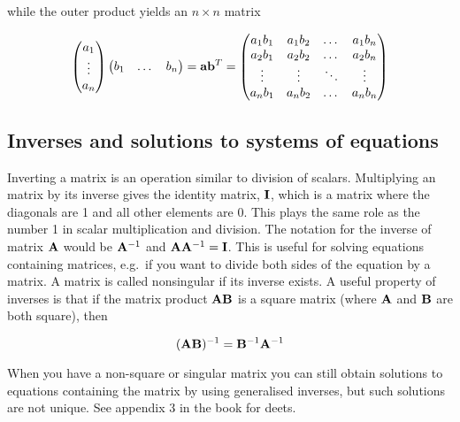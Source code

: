 \documentclass[
]{book}
\begin{document}
while the outer product yields an \(n \times n\) matrix

\begin{equation}
    \begin{pmatrix}
        a_1 \\
        \vdots \\
        a_n
    \end{pmatrix}
    \begin{pmatrix}
        b_1 & \dots & b_n
    \end{pmatrix}

    = \mx{a}\mx{b}^T = 

    \begin{pmatrix}
        a_1b_1 & a_1b_2 & \dots & a_1b_n \\
        a_2b_1 & a_2b_2 & \dots & a_2b_n \\
        \vdots & \vdots & \ddots & \vdots \\
        a_nb_1 & a_nb_2 & \dots & a_nb_n
    \end{pmatrix}
    \label{eq:outer-product}
\end{equation}

\hypertarget{inverses-and-solutions-to-systems-of-equations}{%
\subsection{Inverses and solutions to systems of equations}\label{inverses-and-solutions-to-systems-of-equations}}

Inverting a matrix is an operation similar to division of scalars. Multiplying an matrix by its inverse gives the identity matrix, \(\mathbf{I}\), which is a matrix where the diagonals are 1 and all other elements are 0. This plays the same role as the number 1 in scalar multiplication and division. The notation for the inverse of matrix \(\mathbf{A}\) would be \(\mathbf{A}^{-1}\) and \(\mathbf{A}\mathbf{A}^{-1} = \mathbf{I}\). This is useful for solving equations containing matrices, e.g.~if you want to divide both sides of the equation by a matrix. A matrix is called nonsingular if its inverse exists. A useful property of inverses is that if the matrix product \(\mathbf{AB}\) is a square matrix (where \(\mathbf{A}\) and \(\mathbf{B}\) are both square), then

\begin{equation}
    (\mathbf{AB})^{-1} = \mathbf{B}^{-1}\mathbf{A}^{-1}
    \label{eq:inverse-of-square-matrix-product}
\end{equation}

When you have a non-square or singular matrix you can still obtain solutions to equations containing the matrix by using generalised inverses, but such solutions are not unique. See appendix 3 in the book for deets.
\end{document}
